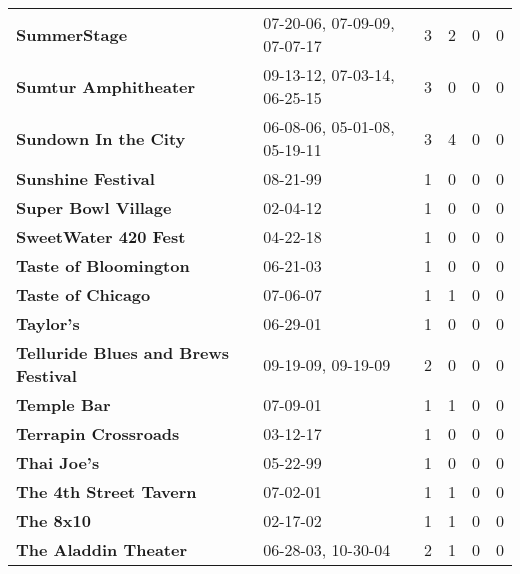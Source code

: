 \begin{supertabular}{llllll}
                                                 \textbf{SummerStage} &  07-20-06, 07-09-09, 07-07-17 &  3 &   2 &  0 &  0 \\
                                         \textbf{Sumtur Amphitheater} &  09-13-12, 07-03-14, 06-25-15 &  3 &   0 &  0 &  0 \\
                                         \textbf{Sundown In the City} &  06-08-06, 05-01-08, 05-19-11 &  3 &   4 &  0 &  0 \\
                                           \textbf{Sunshine Festival} &                      08-21-99 &  1 &   0 &  0 &  0 \\
                                          \textbf{Super Bowl Village} &                      02-04-12 &  1 &   0 &  0 &  0 \\
                                         \textbf{SweetWater 420 Fest} &                      04-22-18 &  1 &   0 &  0 &  0 \\
                                        \textbf{Taste of Bloomington} &                      06-21-03 &  1 &   0 &  0 &  0 \\
                                            \textbf{Taste of Chicago} &                      07-06-07 &  1 &   1 &  0 &  0 \\
                                                    \textbf{Taylor's} &                      06-29-01 &  1 &   0 &  0 &  0 \\
                          \textbf{Telluride Blues and Brews Festival} &            09-19-09, 09-19-09 &  2 &   0 &  0 &  0 \\
                                                  \textbf{Temple Bar} &                      07-09-01 &  1 &   1 &  0 &  0 \\
                                         \textbf{Terrapin Crossroads} &                      03-12-17 &  1 &   0 &  0 &  0 \\
                                                  \textbf{Thai Joe's} &                      05-22-99 &  1 &   0 &  0 &  0 \\
                                       \textbf{The 4th Street Tavern} &                      07-02-01 &  1 &   1 &  0 &  0 \\
                                                    \textbf{The 8x10} &                      02-17-02 &  1 &   1 &  0 &  0 \\
                                         \textbf{The Aladdin Theater} &            06-28-03, 10-30-04 &  2 &   1 &  0 &  0 \\

\end{supertabular}
